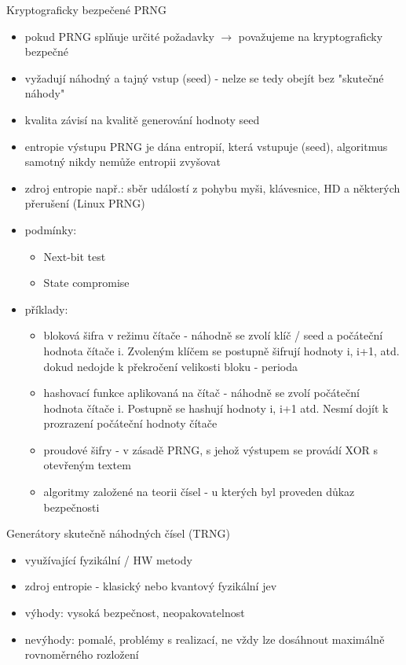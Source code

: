 Kryptograficky bezpečené PRNG
\begin{itemize}
    \item pokud PRNG splňuje určité požadavky $\longrightarrow$ považujeme na kryptograficky bezpečné
    \item vyžadují náhodný a tajný vstup (seed) - nelze se tedy obejít bez "skutečné náhody"
    \item kvalita závisí na kvalitě generování hodnoty seed
    \item entropie výstupu PRNG je dána entropií, která vstupuje (seed), algoritmus samotný nikdy nemůže entropii zvyšovat
    \item zdroj entropie např.: sběr událostí z pohybu myši, klávesnice, HD a některých přerušení (Linux PRNG)
    \item podmínky:
    \begin{itemize}
        \item Next-bit test
        \item State compromise
    \end{itemize}
    \item příklady:
    \begin{itemize}
        \item bloková šifra v režimu čítače - náhodně se zvolí klíč / seed a počáteční hodnota čítače i. Zvoleným klíčem se postupně šifrují hodnoty i, i+1, atd. dokud nedojde k překročení velikosti bloku - perioda
        \item hashovací funkce aplikovaná na čítač - náhodně se zvolí počáteční hodnota čítače i. Postupně se  hashují hodnoty i, i+1 atd. Nesmí dojít k prozrazení počáteční hodnoty čítače
        \item proudové šifry - v zásadě PRNG, s jehož výstupem se provádí XOR s otevřeným textem
        \item algoritmy založené na teorii čísel - u kterých byl proveden důkaz bezpečnosti \\
    \end{itemize}
\end{itemize}

Generátory skutečně náhodných čísel (TRNG)
\begin{itemize}
    \item využívající fyzikální / HW metody
    \item zdroj entropie - klasický nebo kvantový fyzikální jev
    \item výhody: vysoká bezpečnost, neopakovatelnost
    \item nevýhody: pomalé, problémy s realizací, ne vždy lze dosáhnout maximálně rovnoměrného rozložení
\end{itemize}



